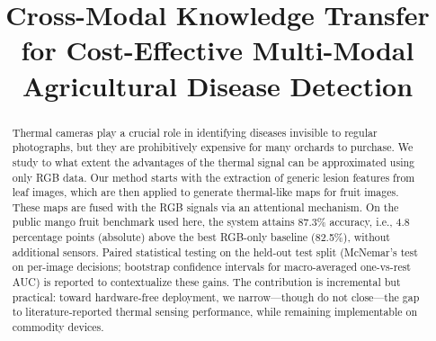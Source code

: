 \documentclass[conference]{IEEEtran}
\begin{document}
\title{Cross-Modal Knowledge Transfer for Cost-Effective Multi-Modal Agricultural Disease Detection}

\author{
    \and
    \and
}

\maketitle

\begin{abstract}
Thermal cameras play a crucial role in identifying diseases invisible to regular photographs, but they are prohibitively expensive for many orchards to purchase. We study to what extent the advantages of the thermal signal can be approximated using only RGB data. Our method starts with the extraction of generic lesion features from leaf images, which are then applied to generate thermal-like maps for fruit images. These maps are fused with the RGB signals via an attentional mechanism. On the public mango fruit benchmark used here, the system attains 87.3\% accuracy, i.e., 4.8 percentage points (absolute) above the best RGB-only baseline (82.5\%), without additional sensors. Paired statistical testing on the held-out test split (McNemar's test on per-image decisions; bootstrap confidence intervals for macro-averaged one-vs-rest AUC) is reported to contextualize these gains. The contribution is incremental but practical: toward hardware-free deployment, we narrow---though do not close---the gap to literature-reported thermal sensing performance, while remaining implementable on commodity devices.
\end{abstract}
\end{document}
